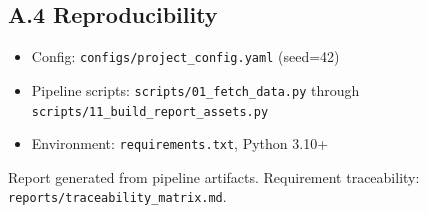 ﻿\documentclass[11pt,a4paper]{article}
\begin{document}
\subsection{A.4 Reproducibility}

\begin{itemize}
  \item Config: \texttt{configs/project\_config.yaml} (seed=42)
  \item Pipeline scripts: \texttt{scripts/01\_fetch\_data.py} through \texttt{scripts/11\_build\_report\_assets.py}
  \item Environment: \texttt{requirements.txt}, Python 3.10+
\end{itemize}


Report generated from pipeline artifacts. Requirement traceability: \texttt{reports/traceability\_matrix.md}.



\end{document}
